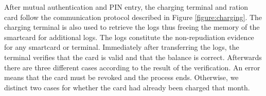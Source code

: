 

After mutual authentication and PIN entry, the charging terminal and ration card follow the communication protocol described in Figure \ref{figure:charging}. The charging terminal is also used to retrieve the logs thus freeing the memory of the smartcard for additional logs. The logs constitute the non-repudiation evidence for any smartcard or terminal. Immediately after transferring the logs, the terminal verifies that the card is valid and that the balance is correct. Afterwards there are three different cases according to the result of the verification. An error means that the card must be revoked and the process ends. Otherwise, we distinct two cases for whether the card had already been charged that month. 

\usetikzlibrary{matrix,shapes,arrows,positioning,chains, calc}

